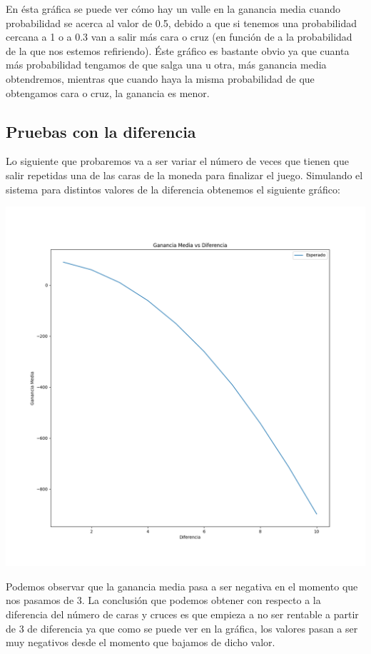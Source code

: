 \documentclass[11pt,a4paper]{report}
\begin{document}
En ésta gráfica se puede ver cómo hay un valle en la ganancia media cuando probabilidad se acerca al valor de 0.5, debido a que si tenemos una probabilidad cercana a 1 o a 0.3 van a salir más cara o cruz (en función de a la probabilidad de la que nos estemos refiriendo). Éste gráfico es bastante obvio ya que cuanta más probabilidad tengamos de que salga una u otra, más ganancia media obtendremos, mientras que cuando haya la misma probabilidad de que obtengamos cara o cruz, la ganancia es menor.
\newpage
\subsection{Pruebas con la diferencia}

Lo siguiente que probaremos va a ser variar el número de veces que tienen que salir repetidas una de las caras de la moneda para finalizar el juego. Simulando el sistema para distintos valores de la diferencia obtenemos el siguiente gráfico:

\begin{center}
	\includegraphics[width=0.6\textheight]{img/Cap-1/3-ganancia-media-vs-diferencia.png}
\end{center}

Podemos observar que la ganancia media pasa a ser negativa en el momento que nos pasamos de 3. La conclusión que podemos obtener con respecto a la diferencia del número de caras y cruces es que empieza a no ser rentable a partir de 3 de diferencia ya que como se puede ver en la gráfica, los valores pasan a ser muy negativos desde el momento que bajamos de dicho valor.
\end{document}
